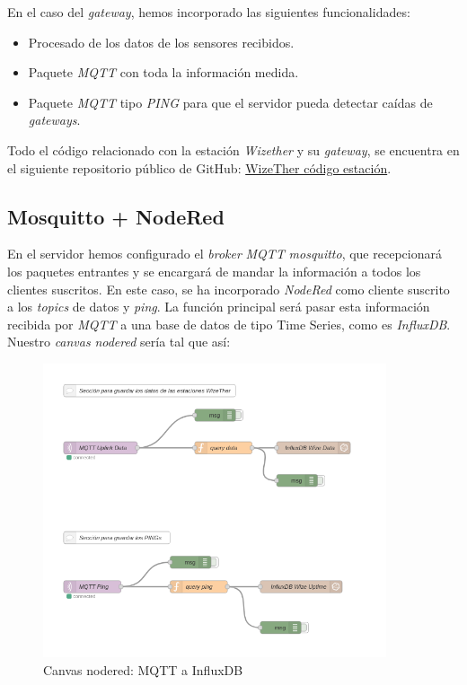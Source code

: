 \documentclass[12pt]{article}
\begin{document}
\noindent En el caso del \textit{gateway}, hemos incorporado las siguientes funcionalidades:
\begin{itemize}
	\item Procesado de los datos de los sensores recibidos.
	\item Paquete \textit{MQTT} con toda la información medida.
	\item Paquete \textit{MQTT} tipo \textit{PING} para que el servidor pueda detectar caídas de \textit{gateways}.
\end{itemize}

\noindent Todo el código relacionado con la estación \textit{Wizether} y su \textit{gateway}, se encuentra en el siguiente repositorio público de GitHub: \href{https://github.com/Raniita/wizether_resources/tree/master/WizeTher_code}{WizeTher código estación}.

\pagebreak

\subsection{Mosquitto + NodeRed}
En el servidor hemos configurado el \textit{broker} \textit{MQTT} \textit{mosquitto}, que recepcionará los paquetes entrantes y se encargará de mandar la información a todos los clientes suscritos. En este caso, se ha incorporado \textit{NodeRed} como cliente suscrito a los \textit{topics} de datos y \textit{ping}. La función principal será pasar esta información recibida por \textit{MQTT} a una base de datos de tipo Time Series, como es \textit{InfluxDB}. Nuestro \textit{canvas} \textit{nodered} sería tal que así:

\begin{figure}[h]
	\begin{center}
		\includegraphics[width=0.9\textwidth]{img_rani/nodered_mqtt.png}
		\caption{Canvas nodered: MQTT a InfluxDB}
	\end{center}
\end{figure}
\end{document}
